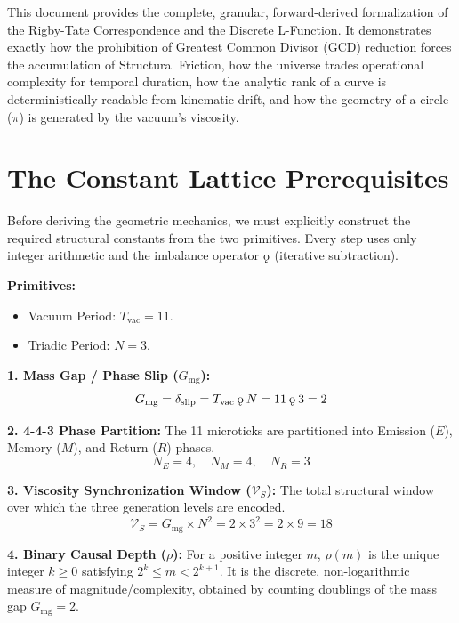 \documentclass[11pt, letterpaper]{article}
\newcommand{\koppa}{\mathbin{\text{\rm\k{o}}}}
\newcommand{\Tvac}{T_{\mathrm{vac}}}
\newcommand{\Gmg}{G_{\mathrm{mg}}}
\newcommand{\dslip}{\delta_{\mathrm{slip}}}
\newcommand{\rank}{\rho}
\newcommand{\VS}{\mathcal{V}_S}
\begin{document}
This document provides the complete, granular, forward-derived formalization of the Rigby-Tate Correspondence and the Discrete L-Function. It demonstrates exactly how the prohibition of Greatest Common Divisor (GCD) reduction forces the accumulation of Structural Friction, how the universe trades operational complexity for temporal duration, how the analytic rank of a curve is deterministically readable from kinematic drift, and how the geometry of a circle ($\pi$) is generated by the vacuum's viscosity.

\section{The Constant Lattice Prerequisites}

Before deriving the geometric mechanics, we must explicitly construct the required structural constants from the two primitives. Every step uses only integer arithmetic and the imbalance operator $\koppa$ (iterative subtraction).

\begin{rsbox}
\textbf{Primitives:}
\begin{itemize}
    \item Vacuum Period: $\Tvac = 11$.
    \item Triadic Period: $N = 3$.
\end{itemize}

\textbf{1. Mass Gap / Phase Slip ($\Gmg$):}
\[ \Gmg = \dslip = \Tvac \koppa N = 11 \koppa 3 = 2 \]

\textbf{2. 4-4-3 Phase Partition:}
The 11 microticks are partitioned into Emission ($E$), Memory ($M$), and Return ($R$) phases.
\[ N_E = 4, \quad N_M = 4, \quad N_R = 3 \]

\textbf{3. Viscosity Synchronization Window ($\VS$):}
The total structural window over which the three generation levels are encoded.
\[ \VS = \Gmg \times N^2 = 2 \times 3^2 = 2 \times 9 = 18 \]

\textbf{4. Binary Causal Depth ($\rank$):}
For a positive integer $m$, $\rank(m)$ is the unique integer $k \ge 0$ satisfying $2^k \le m < 2^{k+1}$. It is the discrete, non-logarithmic measure of magnitude/complexity, obtained by counting doublings of the mass gap $\Gmg = 2$.
\end{rsbox}

\end{document}
